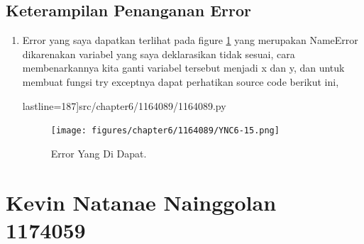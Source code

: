 \subsection{Keterampilan Penanganan Error}

\begin{enumerate}

\item Error yang saya dapatkan terlihat pada figure \ref{YNC6-15} yang merupakan NameError dikarenakan variabel yang saya deklarasikan tidak sesuai, cara membenarkannya kita ganti variabel tersebut menjadi x dan y, dan untuk membuat fungsi try exceptnya dapat perhatikan source code berikut ini,

	 lastline=187]{src/chapter6/1164089/1164089.py}

	\begin{figure}[!htbp!]
		\centerline{\texttt{[image: figures/chapter6/1164089/YNC6-15.png]}}
		\caption{Error Yang Di Dapat.}
		\label{YNC6-15}
	\end{figure}

\end{enumerate}

\section {Kevin Natanae Nainggolan 1174059}
